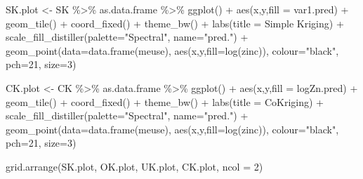 \documentclass[
]{book}
\newenvironment{Shaded}{\begin{snugshade}}{\end{snugshade}}
\newcommand{\AttributeTok}[1]{\textcolor[rgb]{0.77,0.63,0.00}{#1}}
\newcommand{\DecValTok}[1]{\textcolor[rgb]{0.00,0.00,0.81}{#1}}
\newcommand{\FunctionTok}[1]{\textcolor[rgb]{0.00,0.00,0.00}{#1}}
\newcommand{\NormalTok}[1]{#1}
\newcommand{\OtherTok}[1]{\textcolor[rgb]{0.56,0.35,0.01}{#1}}
\newcommand{\SpecialCharTok}[1]{\textcolor[rgb]{0.00,0.00,0.00}{#1}}
\newcommand{\StringTok}[1]{\textcolor[rgb]{0.31,0.60,0.02}{#1}}
\begin{document}
\begin{Shaded}
\begin{Highlighting}[]
\NormalTok{SK.plot }\OtherTok{\textless{}{-}}\NormalTok{ SK }\SpecialCharTok{\%\textgreater{}\%}\NormalTok{ as.data.frame }\SpecialCharTok{\%\textgreater{}\%}
  \FunctionTok{ggplot}\NormalTok{() }\SpecialCharTok{+} \FunctionTok{aes}\NormalTok{(x,y,}\AttributeTok{fill =}\NormalTok{ var1.pred) }\SpecialCharTok{+} 
  \FunctionTok{geom\_tile}\NormalTok{() }\SpecialCharTok{+} \FunctionTok{coord\_fixed}\NormalTok{() }\SpecialCharTok{+} \FunctionTok{theme\_bw}\NormalTok{() }\SpecialCharTok{+} \FunctionTok{labs}\NormalTok{(}\AttributeTok{title =} \StringTok{\textquotesingle{}Simple Kriging\textquotesingle{}}\NormalTok{) }\SpecialCharTok{+} 
  \FunctionTok{scale\_fill\_distiller}\NormalTok{(}\AttributeTok{palette=}\StringTok{"Spectral"}\NormalTok{, }\AttributeTok{name=}\StringTok{"pred."}\NormalTok{)  }\SpecialCharTok{+} 
  \FunctionTok{geom\_point}\NormalTok{(}\AttributeTok{data=}\FunctionTok{data.frame}\NormalTok{(meuse), }\FunctionTok{aes}\NormalTok{(x,y,}\AttributeTok{fill=}\FunctionTok{log}\NormalTok{(zinc)), }\AttributeTok{colour=}\StringTok{"black"}\NormalTok{,}
             \AttributeTok{pch=}\DecValTok{21}\NormalTok{, }\AttributeTok{size=}\DecValTok{3}\NormalTok{) }

\NormalTok{CK.plot }\OtherTok{\textless{}{-}}\NormalTok{ CK }\SpecialCharTok{\%\textgreater{}\%}\NormalTok{ as.data.frame }\SpecialCharTok{\%\textgreater{}\%}
  \FunctionTok{ggplot}\NormalTok{() }\SpecialCharTok{+} \FunctionTok{aes}\NormalTok{(x,y,}\AttributeTok{fill =}\NormalTok{ logZn.pred) }\SpecialCharTok{+} 
  \FunctionTok{geom\_tile}\NormalTok{() }\SpecialCharTok{+} \FunctionTok{coord\_fixed}\NormalTok{() }\SpecialCharTok{+} \FunctionTok{theme\_bw}\NormalTok{() }\SpecialCharTok{+} \FunctionTok{labs}\NormalTok{(}\AttributeTok{title =} \StringTok{\textquotesingle{}CoKriging\textquotesingle{}}\NormalTok{) }\SpecialCharTok{+} 
  \FunctionTok{scale\_fill\_distiller}\NormalTok{(}\AttributeTok{palette=}\StringTok{"Spectral"}\NormalTok{, }\AttributeTok{name=}\StringTok{"pred."}\NormalTok{)  }\SpecialCharTok{+} 
  \FunctionTok{geom\_point}\NormalTok{(}\AttributeTok{data=}\FunctionTok{data.frame}\NormalTok{(meuse), }\FunctionTok{aes}\NormalTok{(x,y,}\AttributeTok{fill=}\FunctionTok{log}\NormalTok{(zinc)), }\AttributeTok{colour=}\StringTok{"black"}\NormalTok{,}
             \AttributeTok{pch=}\DecValTok{21}\NormalTok{, }\AttributeTok{size=}\DecValTok{3}\NormalTok{)}
  
\FunctionTok{grid.arrange}\NormalTok{(SK.plot, OK.plot, UK.plot, CK.plot, }\AttributeTok{ncol =} \DecValTok{2}\NormalTok{)}
\end{Highlighting}
\end{Shaded}
\end{document}
